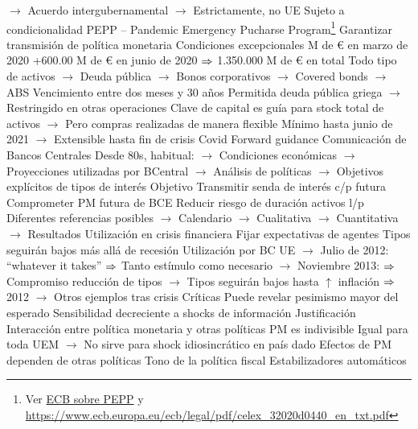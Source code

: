 \documentclass{nuevotema}
\begin{document}
\begin{esquemal}
				\4[] $\to$ Acuerdo intergubernamental
				\4[] $\to$ Estrictamente, no UE
				\4[] Sujeto a condicionalidad
				\4 PEPP -- Pandemic Emergency Pucharse Program\footnote{Ver \href{https://www.ecb.europa.eu/mopo/implement/pepp/html/index.en.html}{ECB sobre PEPP} y \href{Decisión del BCE de 24 de marzo de 2020}{https://www.ecb.europa.eu/ecb/legal/pdf/celex\_32020d0440\_en\_txt.pdf}}
				\4[] Garantizar transmisión de política monetaria
				\4[] Condiciones excepcionales
				 M de € en marzo de 2020
				\4[] +600.00 M de € en junio de 2020
				\4[] $\Rightarrow$ 1.350.000 M de € en total
				\4[] Todo tipo de activos
				\4[] $\to$ Deuda pública
				\4[] $\to$ Bonos corporativos
				\4[] $\to$ Covered bonds
				\4[] $\to$ ABS
				\4[] Vencimiento entre dos meses y 30 años
				\4[] Permitida deuda pública griega
				\4[] $\to$ Restringido en otras operaciones
				\4[] Clave de capital es guía para stock total de activos
				\4[] $\to$ Pero compras realizadas de manera flexible
				\4[] Mínimo hasta junio de 2021
				\4[] $\to$ Extensible hasta fin de crisis Covid
			\3 Forward guidance
				\4 Comunicación de Bancos Centrales
				\4[] Desde 80s, habitual:
				\4[] $\to$ Condiciones económicas
				\4[] $\to$ Proyecciones utilizadas por BCentral
				\4[] $\to$ Análisis de políticas
				\4[] $\to$ Objetivos explícitos de tipos de interés
				\4 Objetivo
				\4[] Transmitir senda de interés c/p futura
				\4[] Comprometer PM futura de BCE
				\4[] Reducir riesgo de duración activos l/p
				\4 Diferentes referencias posibles
				\4[] $\to$ Calendario
				\4[] $\to$ Cualitativa
				\4[] $\to$ Cuantitativa
				\4[] $\to$ Resultados
				\4 Utilización en crisis financiera
				\4[] Fijar expectativas de agentes
				\4[] Tipos seguirán bajos más allá de recesión
				\4 Utilización por BC
				\4[] UE
				\4[] $\to$ Julio de 2012: ``whatever it takes''
				\4[] $\Rightarrow$ Tanto estímulo como necesario
				\4[] $\to$ Noviembre 2013:
				\4[] $\Rightarrow$ Compromiso reducción de tipos
				\4[] $\to$ Tipos seguirán bajos hasta $\uparrow$ inflación
				\4[] $\Rightarrow$ 2012
				\4[] $\to$ Otros ejemplos tras crisis
				\4 Críticas
				\4[] Puede revelar pesimismo mayor del esperado
				\4[] Sensibilidad decreciente a shocks de información
	\1 
		\2 Justificación
			\3 Interacción entre política monetaria y otras políticas
				\4 PM es indivisible
				\4[] Igual para toda UEM
				\4[] $\to$ No sirve para shock idiosincrático en país dado
				\4 Efectos de PM dependen de otras políticas
				\4[] Tono de la política fiscal
				\4[] Estabilizadores automáticos

\end{esquemal}
\end{document}
